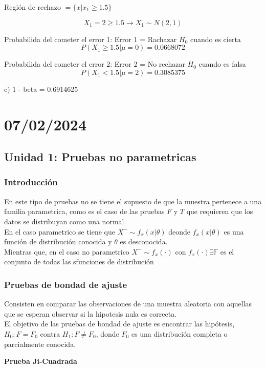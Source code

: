 \documentclass{article}
\begin{document}
Región  de rechazo $ = \{x | x_1 \geq 1.5\}$

\[X_1 = 2 \geq 1.5 \rightarrow X_1 \sim N(2,1)\]

Probabilida del cometer el error 1:
Error 1 = Rachazar $H_0$ cuando es cierta
\[P(X_1 \geq 1.5 | \mu = 0) = 0.0668072\]

Probabilida del cometer el error 2:
Error 2 = No rechazar $H_0$ cuando es falsa
\[P(X_1 < 1.5 | \mu = 2) = 0.3085375\]

c) 1 - beta = 0.6914625

\section{07/02/2024}

\subsection{Unidad 1: Pruebas no parametricas}

\subsubsection{Introducción}

En este tipo de pruebas no se tiene el supuesto de que la muestra pertenece a una familia parametrica, como es el caso de las pruebas $F$ y $T$ que requieren que los datos se distribuyan como una normal. \\
En el caso parametrico se tiene que $X^{-} \sim f_x(x|\theta)$ deonde $f_x(x|\theta)$ es una función de distribución conocida y $\theta$ es desconocida.\\
Mientras que, en el caso no parametrico $X^{-} \sim f_x(\cdot)$ con $f_x(\cdot) \exists \mathbb{F}$ es el conjunto de todas las sfunciones de distribución

\subsubsection{Pruebas de bondad de ajuste}

Consisten en comparar las observaciones de una muestra aleatoria con aquellas que se esperan observar si la hipotesis nula es correcta.\\
El objetivo de las pruebas de bondad de ajuste es encontrar las hipótesis, $H_0: F = F_0$ contra $H_1: F \neq F_0$, donde $F_0$ es una distribución completa o parcialmente conocida.

\textbf{Prueba Ji-Cuadrada}
\end{document}
